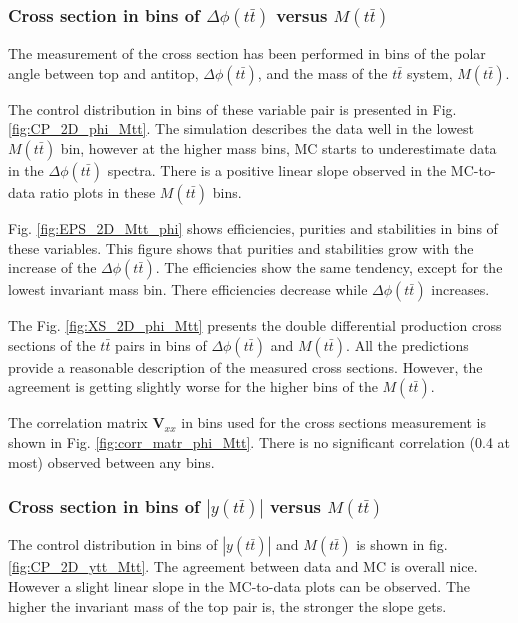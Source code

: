 \subsubsection{Cross section in bins of $\Delta\phi(t\bar{t})$ versus $M(t\bar{t})$}

The measurement of the cross section has been performed in bins of the polar angle between top and antitop, $\Delta\phi(t\bar{t})$, and the mass
of the $t\bar{t}$ system, $M(t\bar{t})$.

The control distribution in bins of these variable pair is presented in Fig. \ref{fig:CP_2D_phi_Mtt}. The simulation describes the data well in the lowest $M(t\bar{t})$ bin, 
however at the higher mass bins, MC starts to underestimate data in the $\Delta\phi(t\bar{t})$ spectra. There is a positive linear slope observed in the MC-to-data ratio plots
in these $M(t\bar{t})$ bins.

Fig. \ref{fig:EPS_2D_Mtt_phi} shows efficiencies, purities and stabilities in bins of these variables. This figure shows that purities and stabilities grow with the 
increase of the $\Delta\phi(t\bar{t})$. The efficiencies show the same tendency, except for the lowest invariant mass bin. There efficiencies decrease while $\Delta\phi(t\bar{t})$
increases.

The Fig. \ref{fig:XS_2D_phi_Mtt} presents the double differential production cross sections of the $t\bar{t}$ pairs in bins of $\Delta\phi(t\bar{t})$ and $M(t\bar{t})$.
All the predictions provide a reasonable description of the measured cross sections. However, the agreement is getting slightly worse for the higher bins of the $M(t\bar{t})$.

The correlation matrix $\mathbf{V}_{xx}$ in bins used for the cross sections measurement is shown in Fig. \ref{fig:corr_matr_phi_Mtt}. There is no significant correlation
(0.4 at most) observed between any bins.

\subsubsection{Cross section in bins of $|y(t\bar{t})|$ versus $M(t\bar{t})$}

The control distribution in bins of $|y(t\bar{t})|$ and $M(t\bar{t})$ is shown in fig. \ref{fig:CP_2D_ytt_Mtt}. The agreement between data and MC is overall nice.
However a slight linear slope in the MC-to-data plots can be observed. The higher the invariant mass of the top pair is, the stronger the slope gets.

